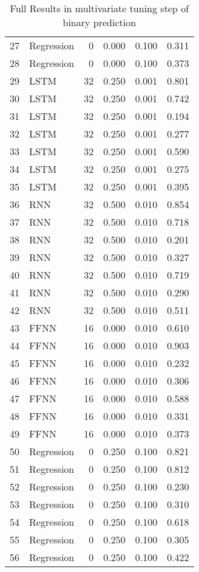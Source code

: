 \begin{table}[ht]
\begin{tabular}{rlrrrr}
  27 & Regression &    0 & 0.000 & 0.100 & 0.311 \\ 
  28 & Regression &    0 & 0.000 & 0.100 & 0.373 \\ 
  29 & LSTM &   32 & 0.250 & 0.001 & 0.801 \\ 
  30 & LSTM &   32 & 0.250 & 0.001 & 0.742 \\ 
  31 & LSTM &   32 & 0.250 & 0.001 & 0.194 \\ 
  32 & LSTM &   32 & 0.250 & 0.001 & 0.277 \\ 
  33 & LSTM &   32 & 0.250 & 0.001 & 0.590 \\ 
  34 & LSTM &   32 & 0.250 & 0.001 & 0.275 \\ 
  35 & LSTM &   32 & 0.250 & 0.001 & 0.395 \\ 
  36 & RNN &   32 & 0.500 & 0.010 & 0.854 \\ 
  37 & RNN &   32 & 0.500 & 0.010 & 0.718 \\ 
  38 & RNN &   32 & 0.500 & 0.010 & 0.201 \\ 
  39 & RNN &   32 & 0.500 & 0.010 & 0.327 \\ 
  40 & RNN &   32 & 0.500 & 0.010 & 0.719 \\ 
  41 & RNN &   32 & 0.500 & 0.010 & 0.290 \\ 
  42 & RNN &   32 & 0.500 & 0.010 & 0.511 \\ 
  43 & FFNN &   16 & 0.000 & 0.010 & 0.610 \\ 
  44 & FFNN &   16 & 0.000 & 0.010 & 0.903 \\ 
  45 & FFNN &   16 & 0.000 & 0.010 & 0.232 \\ 
  46 & FFNN &   16 & 0.000 & 0.010 & 0.306 \\ 
  47 & FFNN &   16 & 0.000 & 0.010 & 0.588 \\ 
  48 & FFNN &   16 & 0.000 & 0.010 & 0.331 \\ 
  49 & FFNN &   16 & 0.000 & 0.010 & 0.373 \\ 
  50 & Regression &    0 & 0.250 & 0.100 & 0.821 \\ 
  51 & Regression &    0 & 0.250 & 0.100 & 0.812 \\ 
  52 & Regression &    0 & 0.250 & 0.100 & 0.230 \\ 
  53 & Regression &    0 & 0.250 & 0.100 & 0.310 \\ 
  54 & Regression &    0 & 0.250 & 0.100 & 0.618 \\ 
  55 & Regression &    0 & 0.250 & 0.100 & 0.305 \\ 
  56 & Regression &    0 & 0.250 & 0.100 & 0.422 \\ 
   \hline
\end{tabular}
\caption{Full Results in multivariate tuning step of binary prediction} 
\label{tab:binary.multivar.par.tuning.full}
\end{table}
